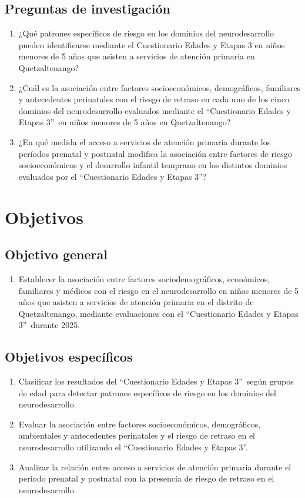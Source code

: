 \documentclass[11pt,letterpaper]{report}
\newcommand{\asq}{“Cuestionario Edades y Etapas 3”}
\begin{document}
\section{Preguntas de investigación}
	\begin{enumerate}
		\item ¿Qué patrones específicos de riesgo en los dominios del
			neurodesarrollo pueden identificarse mediante el Cuestionario
			Edades y Etapas 3 en niños menores de 5 años que asisten a
			servicios de atención primaria en Quetzaltenango?
		\item ¿Cuál es la asociación entre factores socioeconómicos,
			demográficos, familiares y antecedentes perinatales con el riesgo
			de retraso en cada uno de los cinco dominios del neurodesarrollo
			evaluados mediante el \asq\ en niños menores de 5 años en
			Quetzaltenango?
		\item ¿En qué medida el acceso a servicios de atención primaria durante
			los períodos prenatal y postnatal modifica la asociación entre
			factores de riesgo socioeconómicos y el desarrollo infantil
			temprano en los distintos dominios evaluados por el \asq?
	\end{enumerate}

	\chapter{Objetivos}
\section{Objetivo general}
	\begin{enumerate}
		\item Establecer la asociación entre factores sociodemográficos,
		económicos, familiares y médicos con el riesgo en el neurodesarrollo en
		niños menores de 5 años que asisten a servicios de atención primaria en
		el distrito de Quetzaltenango, mediante evaluaciones con el \asq\
		durante 2025.
	\end{enumerate}
\section{Objetivos específicos}
	\begin{enumerate}
		\item Clasificar los resultados del \asq\ según grupos de edad para
		detectar patrones específicos de riesgo en los dominios del
		neurodesarrollo.
		
		\item Evaluar la asociación entre factores socioeconómicos,
		demográficos, ambientales y antecedentes perinatales y el riesgo de
		retraso en el neurodesarrollo utilizando el \asq.
		
		\item Analizar la relación entre acceso a servicios de atención
		primaria durante el periodo prenatal y postnatal con la presencia de
		riesgo de retraso en el neurodesarrollo.
	\end{enumerate}
\end{document}
